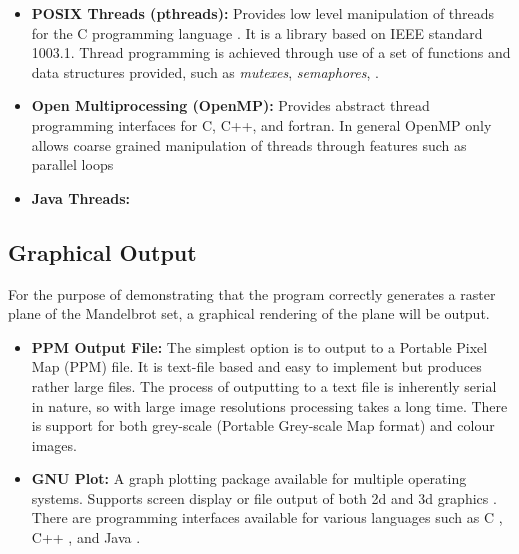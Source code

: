 \begin{itemize}
\item \textbf{POSIX Threads (pthreads):} Provides low level manipulation of threads for the C programming language \cite{pthreadover}. 
              It is a library based on IEEE standard 1003.1. Thread programming is achieved through use of a set of functions and data
              structures provided, such as \textit{mutexes}, \textit{semaphores}, \textit{ }. %
             
\item \textbf{Open Multiprocessing (OpenMP):} Provides abstract thread programming interfaces for C, C++, and fortran.
              In general OpenMP only allows coarse grained manipulation of threads through features such as parallel loops %
              \cite{ompvspthr}

\item \textbf{Java Threads:}
\end{itemize}

\subsection*{Graphical Output}
For the purpose of demonstrating that the program correctly generates a raster plane
of the Mandelbrot set, a graphical rendering of the plane will be output.

\begin{itemize}
\item \textbf{PPM Output File:} The simplest option is to output to a Portable Pixel Map (PPM) file. It is 
              text-file based and easy to implement but produces rather large files. 
              The process of outputting to a text file is inherently serial in nature,
              so with large image resolutions processing takes a long time.
              There is support for both grey-scale (Portable Grey-scale Map format) and colour images. 
              \cite{ppmspec}
              
\item \textbf{GNU Plot:} A graph plotting package available for multiple operating systems. 
              Supports screen display or file output of both 2d and 3d graphics \cite{gnuplot}.
              There are programming interfaces available for various languages such as C \cite{gnuplotcint}, C++ \cite{gnuplotcppint}, 
              and Java \cite{gnuplotjint}.
              
\end{itemize}


